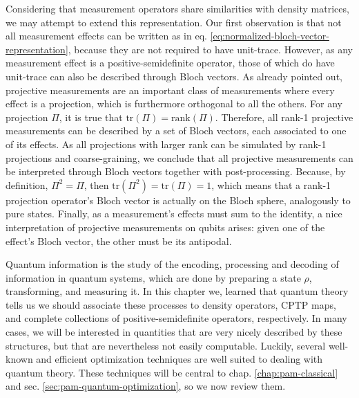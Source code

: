 		Considering that measurement operators share similarities with density matrices, we may attempt to extend this representation. Our first observation is that not all measurement effects can be written as in eq. \ref{eq:normalized-bloch-vector-representation}, because they are not required to have unit-trace. However, as any measurement effect is a positive-semidefinite operator, those of which do have unit-trace can also be described through Bloch vectors. As already pointed out, projective measurements are an important class of measurements where every effect is a projection, which is furthermore orthogonal to all the others. For any projection $\Pi$, it is true that $\text{tr}(\Pi) = \text{rank}(\Pi)$. Therefore, all rank-1 projective measurements can be described by a set of Bloch vectors, each associated to one of its effects. As all projections with larger rank can be simulated by rank-1 projections and coarse-graining, we conclude that all projective measurements can be interpreted through Bloch vectors together with post-processing. Because, by definition, $\Pi^2 = \Pi$, then $\text{tr}(\Pi^2) = \text{tr}(\Pi) = 1$, which means that a rank-1 projection operator's Bloch vector is actually on the Bloch sphere, analogously to pure states. Finally, as a measurement's effects must sum to the identity, a nice interpretation of projective measurements on qubits arises: given one of the effect's Bloch vector, the other must be its antipodal.


		\ornamentbreak
		Quantum information is the study of the encoding, processing and decoding of information in quantum systems, which are done by preparing a state $\rho$, transforming, and measuring it. In this chapter we, learned that quantum theory tells us we should associate these processes to density operators, CPTP maps, and complete collections of positive-semidefinite operators, respectively. In many cases, we will be interested in quantities that are very nicely described by these structures, but that are nevertheless not easily computable. Luckily, several well-known and efficient optimization techniques are well suited to dealing with quantum theory. These techniques will be central to chap. \ref{chap:pam-classical} and sec. \ref{sec:pam-quantum-optimization}, so we now review them.